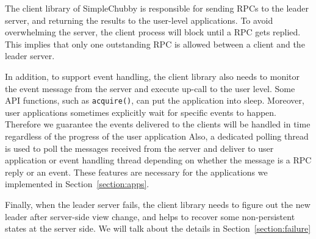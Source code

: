 The client library of SimpleChubby is responsible for sending RPCs to the
leader server, and returning the results to the user-level applications.
To avoid overwhelming the server, the client process will block until a RPC
gets replied. This implies that only one
outstanding RPC is allowed between a client and the leader server.

In addition, to support event handling, the client library also needs to
monitor the event message from the server and execute up-call
to the user level. Some API functions, such as \texttt{acquire()}, can put
the application into sleep. Moreover, user applications sometimes explicitly
wait for specific events to happen. Therefore we guarantee the events delivered to the
clients will be handled in time regardless of the progress of the user application
Also, a dedicated polling
thread is used to poll the messages received from the server and deliver to
user application or event handling thread depending on whether the message
is a RPC reply or an event. These features are necessary
for the applications we implemented in Section~\ref{section:apps}.

Finally, when the leader server fails, the client library needs to figure out
the new leader after server-side view change, and helps to recover some
non-persistent states at the server side. We will talk about the details in
Section~\ref{section:failure}




